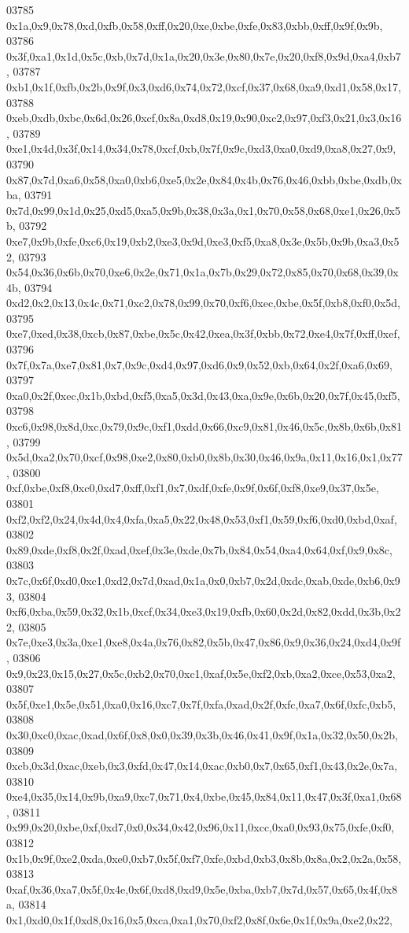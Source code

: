 \begin{DoxyCode}
03785   0x1a,0x9,0x78,0xd,0xfb,0x58,0xff,0x20,0xe,0xbe,0xfe,0x83,0xbb,0xff,0x9f,0x9b,
03786   0x3f,0xa1,0x1d,0x5c,0xb,0x7d,0x1a,0x20,0x3e,0x80,0x7e,0x20,0xf8,0x9d,0xa4,0xb7,
03787   0xb1,0x1f,0xfb,0x2b,0x9f,0x3,0xd6,0x74,0x72,0xcf,0x37,0x68,0xa9,0xd1,0x58,0x17,
03788   0xeb,0xdb,0xbc,0x6d,0x26,0xcf,0x8a,0xd8,0x19,0x90,0xc2,0x97,0xf3,0x21,0x3,0x16,
03789   0xe1,0x4d,0x3f,0x14,0x34,0x78,0xcf,0xb,0x7f,0x9c,0xd3,0xa0,0xd9,0xa8,0x27,0x9,
03790   0x87,0x7d,0xa6,0x58,0xa0,0xb6,0xe5,0x2e,0x84,0x4b,0x76,0x46,0xbb,0xbe,0xdb,0xba,
03791   0x7d,0x99,0x1d,0x25,0xd5,0xa5,0x9b,0x38,0x3a,0x1,0x70,0x58,0x68,0xe1,0x26,0x5b,
03792   0xe7,0x9b,0xfe,0xc6,0x19,0xb2,0xe3,0x9d,0xe3,0xf5,0xa8,0x3e,0x5b,0x9b,0xa3,0x52,
03793   0x54,0x36,0x6b,0x70,0xe6,0x2e,0x71,0x1a,0x7b,0x29,0x72,0x85,0x70,0x68,0x39,0x4b,
03794   0xd2,0x2,0x13,0x4c,0x71,0xc2,0x78,0x99,0x70,0xf6,0xec,0xbe,0x5f,0xb8,0xf0,0x5d,
03795   0xe7,0xed,0x38,0xcb,0x87,0xbe,0x5c,0x42,0xea,0x3f,0xbb,0x72,0xe4,0x7f,0xff,0xef,
03796   0x7f,0x7a,0xe7,0x81,0x7,0x9c,0xd4,0x97,0xd6,0x9,0x52,0xb,0x64,0x2f,0xa6,0x69,
03797   0xa0,0x2f,0xec,0x1b,0xbd,0xf5,0xa5,0x3d,0x43,0xa,0x9e,0x6b,0x20,0x7f,0x45,0xf5,
03798   0xc6,0x98,0x8d,0xc,0x79,0x9c,0xf1,0xdd,0x66,0xc9,0x81,0x46,0x5c,0x8b,0x6b,0x81,
03799   0x5d,0xa2,0x70,0xcf,0x98,0xe2,0x80,0xb0,0x8b,0x30,0x46,0x9a,0x11,0x16,0x1,0x77,
03800   0xf,0xbe,0xf8,0xc0,0xd7,0xff,0xf1,0x7,0xdf,0xfe,0x9f,0x6f,0xf8,0xe9,0x37,0x5e,
03801   0xf2,0xf2,0x24,0x4d,0x4,0xfa,0xa5,0x22,0x48,0x53,0xf1,0x59,0xf6,0xd0,0xbd,0xaf,
03802   0x89,0xde,0xf8,0x2f,0xad,0xef,0x3e,0xde,0x7b,0x84,0x54,0xa4,0x64,0xf,0x9,0x8c,
03803   0x7c,0x6f,0xd0,0xc1,0xd2,0x7d,0xad,0x1a,0x0,0xb7,0x2d,0xdc,0xab,0xde,0xb6,0x93,
03804   0xf6,0xba,0x59,0x32,0x1b,0xcf,0x34,0xe3,0x19,0xfb,0x60,0x2d,0x82,0xdd,0x3b,0x22,
03805   0x7e,0xe3,0x3a,0xe1,0xe8,0x4a,0x76,0x82,0x5b,0x47,0x86,0x9,0x36,0x24,0xd4,0x9f,
03806   0x9,0x23,0x15,0x27,0x5c,0xb2,0x70,0xc1,0xaf,0x5e,0xf2,0xb,0xa2,0xce,0x53,0xa2,
03807   0x5f,0xe1,0x5e,0x51,0xa0,0x16,0xc7,0x7f,0xfa,0xad,0x2f,0xfc,0xa7,0x6f,0xfc,0xb5,
03808   0x30,0xc0,0xac,0xad,0x6f,0x8,0x0,0x39,0x3b,0x46,0x41,0x9f,0x1a,0x32,0x50,0x2b,
03809   0xcb,0x3d,0xac,0xeb,0x3,0xfd,0x47,0x14,0xac,0xb0,0x7,0x65,0xf1,0x43,0x2e,0x7a,
03810   0xe4,0x35,0x14,0x9b,0xa9,0xc7,0x71,0x4,0xbe,0x45,0x84,0x11,0x47,0x3f,0xa1,0x68,
03811   0x99,0x20,0xbe,0xf,0xd7,0x0,0x34,0x42,0x96,0x11,0xcc,0xa0,0x93,0x75,0xfe,0xf0,
03812   0x1b,0x9f,0xe2,0xda,0xe0,0xb7,0x5f,0xf7,0xfe,0xbd,0xb3,0x8b,0x8a,0x2,0x2a,0x58,
03813   0xaf,0x36,0xa7,0x5f,0x4e,0x6f,0xd8,0xd9,0x5e,0xba,0xb7,0x7d,0x57,0x65,0x4f,0x8a,
03814   0x1,0xd0,0x1f,0xd8,0x16,0x5,0xca,0xa1,0x70,0xf2,0x8f,0x6e,0x1f,0x9a,0xe2,0x22,

\end{DoxyCode}
